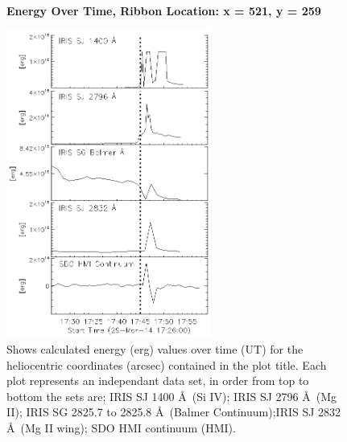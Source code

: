 \begin{figure}[H]
  \begin{center}
  \textbf{Energy Over Time, Ribbon Location: x = 521, y = 259 }\par\medskip
  \includegraphics[width=0.6\textwidth]{29-Mar-14-Ribbon-xyPosition-521-259-Frame-2-Energy-Ladder}
  \end{center}
  \caption{Shows calculated energy (erg) values over time (UT) for the heliocentric coordinates (arcsec) contained in the plot title. Each plot represents an independant data set, in order from top to bottom the sets are; IRIS SJ 1400 \AA\ (Si IV); IRIS SJ 2796 \AA\ (Mg II); IRIS SG  2825.7 to 2825.8 \AA\ (Balmer Continuum);IRIS SJ 2832 \AA\ (Mg II wing); SDO HMI continuum (HMI).}\label{erb14}
\end{figure}

